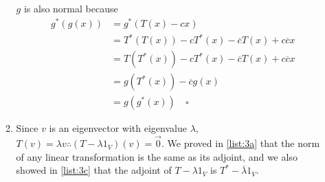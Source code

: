\documentclass[12pt]{article}
\begin{document}
\begin{enumerate}
\begin{enumerate}
                        $g$ is also normal because
                        \begin{align*}
                              g^*(g(x)) & = g^*(T(x)-cx)                                      \\
                                        & = T^*(T(x))-cT^*(x)-\overline{c}T(x)+c\overline{c}x \\
                                        & = T(T^*(x))-cT^*(x)-\overline{c}T(x)+c\overline{c}x \\
                                        & = g(T^*(x))-\overline{c}g(x)                        \\
                                        & = g(g^*(x))\quad\square
                        \end{align*}
                  \item Since $v$ is an eigenvector with eigenvalue $\lambda$,
                        $T(v)=\lambda v \therefore (T-\lambda \mathrm{1}_V)(v)=\vec{0}$.
                        We proved in \ref{list:3a} that the norm of any linear transformation
                        is the same as its adjoint, and we also showed in \ref{list:3c} that
                        the adjoint of $T-\lambda \mathrm{1}_V$ is $T^*-\overline{\lambda} \mathrm{1}_V$.


\end{enumerate}
\end{enumerate}
\end{document}
